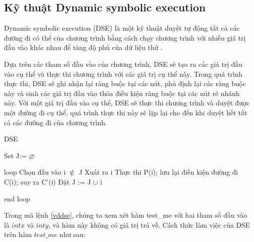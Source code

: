 \subsection{Kỹ thuật Dynamic symbolic execution}
Dynamic symbolic execution (DSE) là một kỹ thuật duyệt tự động tất cả các đường đi có thể của chương trình bằng cách chạy chương trình với nhiều giá trị đầu vào khác nhau để tăng độ phủ của dữ liệu thử \cite{xie2009fitness}.

Dựa trên các tham số đầu vào của chương trình, DSE sẽ tạo ra các giá trị đầu vào cụ thể và thực thi chương trình với các giá trị cụ thể này. Trong quá trình thực thi, DSE sẽ ghi nhận lại ràng buộc tại các nút, phủ định lại các ràng buộc này và sinh các giá trị đầu vào thỏa điều kiện ràng buộc tại các nút rẽ nhánh này. Với một giá trị đầu vào cụ thể, DSE sẽ thực thi chương trình và duyệt được một đường đi cụ thể, quá trình thực thi này sẽ lặp lại cho đến khi duyệt hết tất cả các đường đi của chương trình.

\begin{algorithm}
	\caption{DSE}
	\begin{algorithmic}	
		\item Set J:= $\varnothing $ 
		\item loop
			\subitem Chọn đầu vào i $\notin $ J 
			\subitem Xuất ra i
			\subitem Thực thi P(i); lưu lại điều kiện đường đi C(i); suy ra C'(i)
			\subitem Đặt J := J $\cup $ i			
		\item end loop
	\end{algorithmic}
\end{algorithm}


	
Trong mã lệnh \ref{vddse}, chúng ta xem xét hàm test\_me với hai tham số đầu vào là $int x$ và $int y$, và hàm này không có giá trị trả về. Cách thức làm việc của DSE trên hàm $test\_me$ như sau: 

